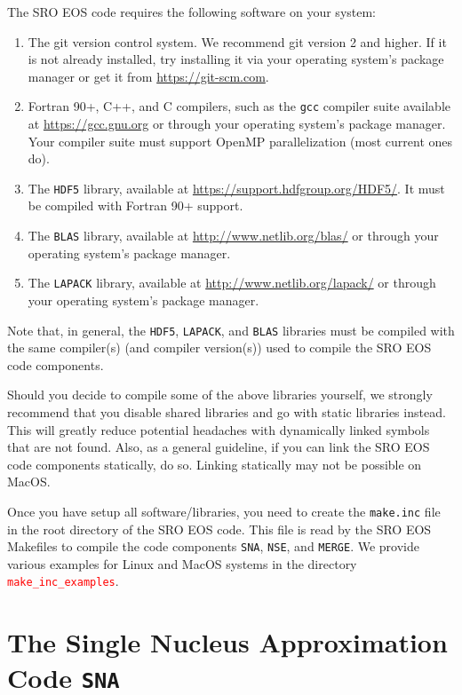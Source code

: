 \documentclass[letterpaper,11pt]{refart}
\begin{document}
The SRO EOS code requires the following software on your system:

\begin{enumerate}
\item The git version control system. We recommend git version 2 and
  higher. If it is not already installed, try installing it via
  your operating system's package manager or get it from
  \url{https://git-scm.com}.
 \item Fortran 90+, C++, and C compilers, such as the \verb|gcc|
   compiler suite available at \url{https://gcc.gnu.org} or
   through your operating system's package manager. Your compiler suite
   must support OpenMP parallelization (most current ones do).

 \item The \verb|HDF5| library, available at
   \url{https://support.hdfgroup.org/HDF5/}. It must be compiled with
   Fortran 90+ support.

 \item The \verb|BLAS| library, available at
   \url{http://www.netlib.org/blas/} or through your operating
   system's package manager.

 \item The \verb|LAPACK| library, available at
   \url{http://www.netlib.org/lapack/} or through your operating
   system's package manager.

\end{enumerate}
Note that, in general, the \verb|HDF5|, \verb|LAPACK|, and \verb|BLAS|
libraries must be compiled with the same compiler(s) (and compiler
version(s)) used to compile the SRO EOS code components.

Should you decide to compile some of the above libraries yourself, we
strongly recommend that you disable shared libraries and go with
static libraries instead. This will greatly reduce potential headaches
with dynamically linked symbols that are not found. Also, as a general
guideline, if you can link the SRO EOS code components statically, do
so. Linking statically may not be possible on MacOS.

Once you have setup all software/libraries, you need to create the
\texttt{make.inc} file in the root directory of the SRO EOS code. This
file is read by the SRO EOS Makefiles to compile the code components
\texttt{SNA}, \texttt{NSE}, and \texttt{MERGE}. We provide various
examples for Linux and MacOS systems in the directory \textcolor{red}{\texttt{make\_inc\_examples}}.


\section{The Single Nucleus Approximation Code \texttt{SNA}}\label{sec:SNA}
\end{document}
